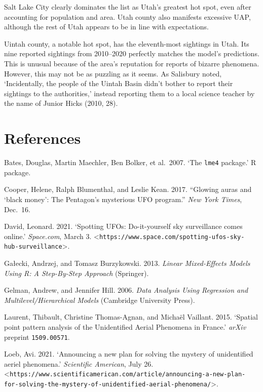 \documentclass[]{elsarticle} %
\begin{document}
Salt Lake City clearly dominates the list as Utah's greatest hot spot,
even after accounting for population and area. Utah county also
manifests excessive UAP, although the rest of Utah appears to be in line
with expectations.

Uintah county, a notable hot spot, has the eleventh-most sightings in
Utah. Its nine reported sightings from 2010--2020 perfectly matches the
model's predictions. This is unusual because of the area's reputation
for reports of bizarre phenomena. However, this may not be as puzzling
as it seems. As Salisbury noted, `Incidentally, the people of the Uintah
Basin didn't bother to report their sightings to the authorities,'
instead reporting them to a local science teacher by the name of Junior
Hicks (2010, 28).

\pagebreak

\hypertarget{references}{%
\section{References}\label{references}}

\setlength{\parindent}{-0.25in}
\setlength{\leftskip}{0.25in}
\setlength{\parskip}{6pt}

Bates, Douglas, Martin Maechler, Ben Bolker, et al.~2007. `The
\texttt{lme4} package.' R package.

Cooper, Helene, Ralph Blumenthal, and Leslie Kean. 2017. ``Glowing auras
and `black money': The Pentagon's mysterious UFO program.'' \emph{New
York Times}, Dec.~16.

David, Leonard. 2021. `Spotting UFOs: Do-it-yourself sky surveillance
comes online.' \emph{Space.com}, March 3.
\textless{}\texttt{https://www.space.com/spotting-ufos-sky-}
\texttt{hub-surveillance}\textgreater.

Gałecki, Andrzej, and Tomasz Burzykowski. 2013. \emph{Linear
Mixed-Effects Models Using R: A Step-By-Step Approach} (Springer).

Gelman, Andrew, and Jennifer Hill. 2006. \emph{Data Analysis Using
Regression and Multilevel/Hierarchical Models} (Cambridge University
Press).

Laurent, Thibault, Christine Thomas-Agnan, and Michaël Vaillant. 2015.
`Spatial point pattern analysis of the Unidentified Aerial Phenomena in
France.' \emph{arXiv} preprint \texttt{1509.00571}.

Loeb, Avi. 2021. `Announcing a new plan for solving the mystery of
unidentified aeriel phenomena.' \emph{Scientific American}, July 26.\\
\textless{}\texttt{https://www.scientificamerican.com/article/announcing-a-new-plan-}
\texttt{for-solving-the-mystery-of-unidentified-aerial-phenomena/}\textgreater.
\end{document}
